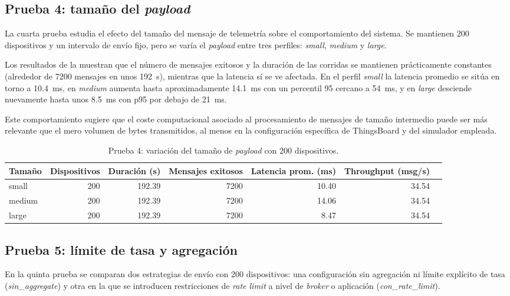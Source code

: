 \subsection{Prueba 4: tama\~no del \emph{payload}}
La cuarta prueba estudia el efecto del tama\~no del mensaje de telemetr\'ia sobre el comportamiento del sistema. Se mantienen \num{200} dispositivos y un intervalo de env\'io fijo, pero se var\'ia el \emph{payload} entre tres perfiles: \textit{small}, \textit{medium} y \textit{large}.

Los resultados de la  muestran que el n\'umero de mensajes exitosos y la duraci\'on de las corridas se mantienen pr\'acticamente constantes (alrededor de \num{7200} mensajes en unos \num{192}~\si{\second}), mientras que la latencia s\'i se ve afectada. En el perfil \textit{small} la latencia promedio se sit\'ua en torno a \SI{10.4}{\milli\second}, en \textit{medium} aumenta hasta aproximadamente \SI{14.1}{\milli\second} con un percentil 95 cercano a \SI{54}{\milli\second}, y en \textit{large} desciende nuevamente hasta unos \SI{8.5}{\milli\second} con p95 por debajo de \SI{21}{\milli\second}.

Este comportamiento sugiere que el coste computacional asociado al procesamiento de mensajes de tama\~no intermedio puede ser m\'as relevante que el mero volumen de bytes transmitidos, al menos en la configuraci\'on espec\'ifica de ThingsBoard y del simulador empleada.

\begin{table}[!t]
\centering
\caption{Prueba 4: variaci\'on del tama\~no de \emph{payload} con 200 dispositivos.}
\label{tab:prueba4}
\begin{tabular}{@{}lrrrrrr@{}}
\toprule
Tama\~no & Dispositivos & Duraci\'on (s) & Mensajes exitosos & Latencia prom. (ms) & Throughput (msg/s) \\
\midrule
small  & 200 & 192.39 & 7200 & 10.40 & 34.54 \\
medium & 200 & 192.39 & 7200 & 14.06 & 34.54 \\
large  & 200 & 192.39 & 7200 &  8.47 & 34.54 \\
\bottomrule
\end{tabular}
\end{table}

\subsection{Prueba 5: l\'imite de tasa y agregaci\'on}
En la quinta prueba se comparan dos estrategias de env\'io con \num{200} dispositivos: una configuraci\'on sin agregaci\'on ni l\'imite expl\'icito de tasa (\textit{sin\_aggregate}) y otra en la que se introducen restricciones de \emph{rate limit} a nivel de \emph{broker} o aplicaci\'on (\textit{con\_rate\_limit}).

